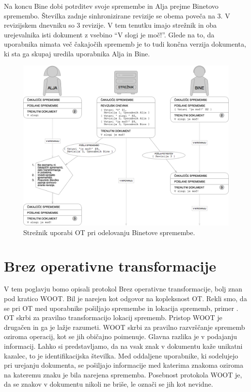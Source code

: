 \documentclass[a4paper, 12pt, twoside]{book}
\begin{document}
\pagebreak

Na koncu Bine dobi potrditev svoje spremembe in Alja prejme Binetovo spremembo. Številka zadnje sinhronizirane revizije se obema poveča na 3. V revizijskem dnevniku so 3 revizije. V tem tenutku imajo strežnik in oba urejevalnika isti dokument z vsebino “V slogi je moč!”. Glede na to, da uporabnika nimata več čakajočih sprememb je to tudi končna verzija dokumenta, ki sta ga skupaj uredila uporabnika Alja in Bine.

\begin{figure}[placement h]
\begin{center}
\includegraphics[width=14cm]{pc6.png}
\end{center}
\caption{Strežnik uporabi OT pri odelovanju Binetove spremembe.}
\label{pc6}
\end{figure}

\section{Brez operativne transformacije}

V tem poglavju bomo opisali protokol Brez operativne transformacije, bolj znan pod kratico WOOT. Bil je narejen kot odgovor na kopleksnost OT. Rekli smo, da se \linebreak pri OT med uporabnike pošiljajo spremembe in lokacija sprememb, primer . OT skrbi za pravilno transformacijo lokacij sprememb. Pristop WOOT je drugačen in ga je lažje razumeti. WOOT skrbi za pravilno razvrščanje sprememb oziroma operacij, kot se jih običajno poimenuje. Glavna razlika je v podajanju informacij. Lahko si predstavljamo, da na vsak znak v dokumentu kaže unikatni kazalec, to je identifikacijska številka. Med oddaljene uporabnike, ki sodelujejo pri urejanju dokumenta, se pošiljajo informacije med katerima znakoma oziroma na kateremu znaku je bila narejena sprememba. Posebnost protokola WOOT je, da se znakov v dokumentu nikoli ne briše, le označi se jih kot nevidne.
\end{document}
